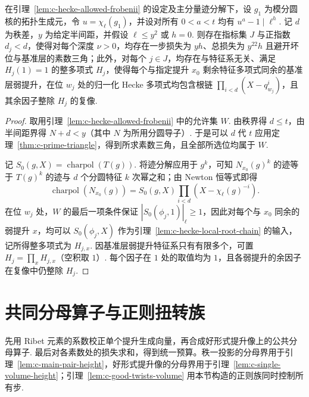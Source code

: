 \begin{lemma}
\label{lem:c-hecke-root-chain-triangle}
\emitthmsource
在引理~\ref{lem:c-hecke-allowed-frobenii} 的设定及主分量迹分解下，设 $g_1$ 为模分圆核的拓扑生成元，令 $u=\chi_\ell(g_1)$，并设对所有 $0<a<t$ 均有 $u^a-1\mid\ell^h$. 记 $d$ 为秩差，$y$ 为给定半间距，并假设 $\ell\le y^2$ 或 $h=0$. 则存在指标集 $J$ 与正指数 $d_j<d$，使得对每个深度 $\nu>0$，均存在一步损失为 $yh$、总损失为 $y^{22}h$ 且避开坏位与基准层的素数三角；此外，对每个 $j\in J$，均存在与特征系无关、满足 $H_j(1)=1$ 的整多项式 $H_j$，使得每个与指定提升 $x_0$ 剩余特征多项式同余的基准层弱提升，在位 $w_j$ 处的归一化 Hecke 多项式均包含根链 $\prod_{i<d}(X-q_{w_j}^i)$，且其余因子整除 $H_j$ 的复像.
\end{lemma}
\begin{proof}
取用引理~\ref{lem:c-hecke-allowed-frobenii} 中的允许集 $W$. 由秩界得 $d\le t$，由半间距界得 $N+d<y$（其中 $N$ 为所用分圆导子）. 于是可以 $d$ 代 $t$ 应用定理~\ref{thm:c-prime-triangle}，得到所求素数三角，且全部所选位均属于 $W$.

记 $S_0(g,X)=\operatorname{charpol}(T(g))$. 将迹分解应用于 $g^k$，可知 $N_{x_0}(g)^k$ 的迹等于 $T(g)^k$ 的迹与 $d$ 个分圆特征 $k$ 次幂之和；由 Newton 恒等式即得
\[
 \operatorname{charpol}(N_{x_0}(g))=S_0(g,X)\prod_{i<d}(X-\chi_\ell(g)^{-i}).
\]
在位 $w_j$ 处，$W$ 的最后一项条件保证 $|S_0(\phi_j,1)|_\ell\ge1$，因此对每个与 $x_0$ 同余的弱提升 $x$，均可以 $S_0(\phi_j,X)$ 作为引理~\ref{lem:c-hecke-local-root-chain} 的输入，记所得整多项式为 $H_{j,x}$. 因基准层弱提升特征系只有有限多个，可置 $H_j=\prod_x H_{j,x}$（空积取 $1$）. 每个因子在 $1$ 处的取值均为 $1$，且各弱提升的余因子在复像中仍整除 $H_j$.
\end{proof}

\section{共同分母算子与正则扭转族}
\label{sec:c-denominator}

先用 Ribet 元素的系数校正单个提升生成向量，再合成好形式提升像上的公共分母算子. 最后对各素数处的损失求和，得到统一预算。秩一投影的分母界用于引理~\ref{lem:c-main-pair-height}，好形式提升像的分母界用于引理~\ref{lem:c-single-volume-height}；引理~\ref{lem:c-good-twists-volume} 用本节构造的正则族同时控制所有步.

